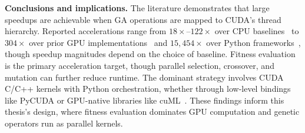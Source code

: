 \documentclass[a4paper,14pt]{extarticle}
\begin{document}
\textbf{Conclusions and implications.} The literature demonstrates that large speedups are achievable when GA operations are mapped to CUDA's thread hierarchy. Reported accelerations range from $18\times$--$122\times$ over CPU baselines~\cite{wu2025evogp,rangavajhala2024accelerating,sathia2021accelerating} to $304\times$ over prior GPU implementations~\cite{wu2025evogp} and $15{,}454\times$ over Python frameworks~\cite{kim2024gpu}, though speedup magnitudes depend on the choice of baseline. Fitness evaluation is the primary acceleration target, though parallel selection, crossover, and mutation can further reduce runtime. The dominant strategy involves CUDA C/C++ kernels with Python orchestration, whether through low-level bindings like PyCUDA or GPU-native libraries like cuML~\cite{sathia2021accelerating}. These findings inform this thesis's design, where fitness evaluation dominates GPU computation and genetic operators run as parallel kernels.
\end{document}
